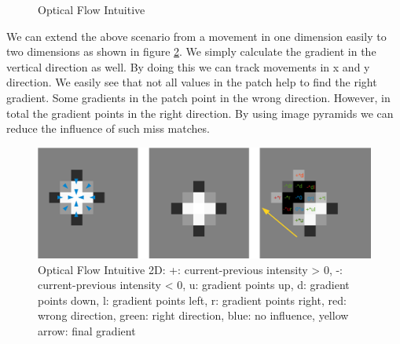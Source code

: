 \documentclass[11pt,a4paper,titlepage,oneside]{report}
\begin{document}
\begin{figure}[H]
  \caption{Optical Flow Intuitive}\label{fig:optical_flow_intuitive}
\end{figure}

We can extend the above scenario from a movement in one dimension easily to two dimensions as shown in figure \ref{fig:optical_flow_2d}. We simply calculate the gradient in the vertical direction as well. By doing this we can track movements in x and y direction. We easily see that not all values in the patch help to find the right gradient. Some gradients in the patch point in the wrong direction. However, in total the gradient points in the right direction. By using image pyramids we can reduce the influence of such miss matches.
\begin{figure}[H]
  \includegraphics[width=1.0\textwidth]{img/optical_flow_2d.png}
  \caption{Optical Flow Intuitive 2D: +: current-previous intensity > 0, -: current-previous intensity < 0, u: gradient points up, d: gradient points down, l: gradient points left, r: gradient points right, red: wrong direction, green: right direction, blue: no influence, yellow arrow: final gradient}\label{fig:optical_flow_2d}
\end{figure}
\end{document}
